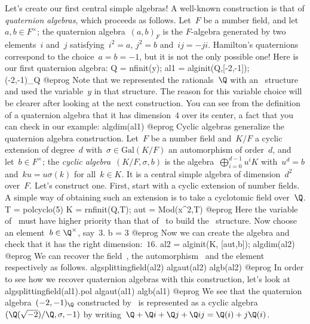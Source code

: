 
Let's create our first central simple algebras! A well-known construction is
that of \emph{quaternion algebras}, which proceeds as follows.
Let~$F$ be a number field, and let~$a,b\in F^\times$; the quaternion
algebra~$(a,b)_F$ is the $F$-algebra generated by two elements~$i$ and~$j$
satisfying~$i^2=a$, $j^2=b$ and~$ij=-ji$. Hamilton's quaternions
correspond to the choice~$a=b=-1$, but it is not the only possible
one! Here is our first quaternion algebra:
\bprog
Q = nfinit(y);
al1 = alginit(Q,[-2,-1]); \\  (-2,-1)_Q
@eprog\noindent
Note that we represented the rationals~$\Q$ with an~ structure and used
the variable~$y$ in that structure. The reason for this variable choice will
be clearer after looking at the next construction. You can see from the
definition of a quaternion algebra that it has dimension~$4$ over its center, a
fact that you can check in our example:
\bprog
algdim(al1)
@eprog\noindent
Cyclic algebras generalize the quaternion algebra construction.
Let~$F$ be a number field and~$K/F$ a cyclic extension of degree~$d$
with~$\sigma\in\text{Gal}(K/F)$ an automorphism of order~$d$, and let~$b\in
F^\times$; the \emph{cyclic algebra}~$(K/F,\sigma,b)$ is the
algebra~$\bigoplus_{i=0}^{d-1}u^iK$ with~$u^d=b$ and~$k u = u \sigma(k)$
for all~$k\in K$. It is a central simple algebra of dimension~$d^2$ over~$F$.
Let's construct one. First, start with a cyclic extension of number fields. A
simple way of obtaining such an extension is to take a cyclotomic field
over~$\Q$.
\bprog
T = polcyclo(5)
K = rnfinit(Q,T);
aut = Mod(x^2,T)
@eprog\noindent
Here the variable of~ must have higher priority than that of~ to
build the~ structure. Now choose an element~$b\in\Q^\times$, say~$3$.
\bprog
b = 3
@eprog\noindent
Now we can create the algebra and check that it has the right dimension:~$16$.
\bprog
al2 = alginit(K, [aut,b]);
algdim(al2)
@eprog\noindent
We can recover the field~, the automorphism~ and the
element~ respectively as follows.
\bprog
algsplittingfield(al2)
algaut(al2)
algb(al2)
@eprog\noindent
In order to see how we recover quaternion algebras with this construction, let's
look at
\bprog
algsplittingfield(al1).pol
algaut(al1)
algb(al1)
@eprog\noindent
We see that the quaternion algebra~$(-2,-1)_{\Q}$ constructed by~ is
represented as a cyclic algebra~$(\Q(\sqrt{-2})/\Q, \sigma, -1)$ by
writing~$\Q+\Q i+\Q j+\Q ij = \Q(i) + j\Q(i)$.

